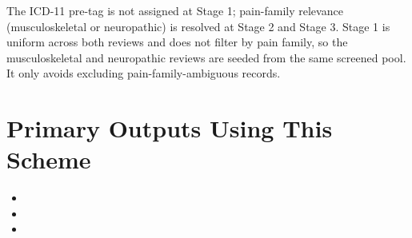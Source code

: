 \documentclass[11pt]{article}
\begin{document}
The ICD-11 pre-tag is not assigned at Stage 1; pain-family relevance (musculoskeletal or neuropathic) is resolved at Stage 2 and Stage 3. Stage 1 is uniform across both reviews and does not filter by pain family, so the musculoskeletal and neuropathic reviews are seeded from the same screened pool. It only avoids excluding pain-family-ambiguous records.


\section*{Primary Outputs Using This Scheme}
\begin{itemize}
\item {}
\item {}
\item {}
\end{itemize}
\end{document}
